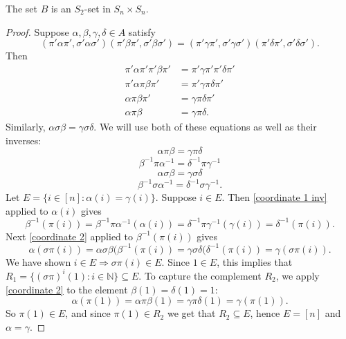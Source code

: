 \documentclass[10pt,a4paper]{amsart}
\begin{document}
\begin{claim} \label{pi alpha pi s2 set}
    The set $B$ is an $S_2$-set in $S_n\times S_n$.
\end{claim}

\begin{proof}
    Suppose $\alpha,\beta,\gamma,\delta\in A$ satisfy
    $$(\pi'\alpha\pi',\sigma'\alpha\sigma')(\pi'\beta\pi',\sigma'\beta\sigma')=(\pi'\gamma\pi',\sigma'\gamma\sigma')(\pi'\delta\pi',\sigma'\delta\sigma').$$
Then
$$\begin{aligned}
    \pi'\alpha\pi'\pi'\beta\pi'&=\pi'\gamma\pi'\pi'\delta\pi'\\
    \pi'\alpha\pi\beta\pi'&=\pi'\gamma\pi\delta\pi'\\
    \alpha\pi\beta\pi'&=\gamma\pi\delta\pi'\\
    \alpha\pi\beta&=\gamma\pi\delta.
\end{aligned}$$
Similarly, $\alpha\sigma\beta=\gamma\sigma\delta$. We will use both of these equations as well as their inverses:
\begin{equation} \label{coordinate 1}
    \alpha\pi\beta=\gamma\pi\delta
\end{equation}
\begin{equation} \label{coordinate 1 inv}
    \beta^{-1}\pi\alpha^{-1}=\delta^{-1}\pi\gamma^{-1}
\end{equation}
\begin{equation} \label{coordinate 2}
    \alpha\sigma\beta=\gamma\sigma\delta
\end{equation}
\begin{equation} \label{coordinate 2 inv}
    \beta^{-1}\sigma\alpha^{-1}=\delta^{-1}\sigma\gamma^{-1}.
\end{equation}
Let $E=\{i\in[n]:\alpha(i)=\gamma(i)\}$. Suppose $i\in E$. Then \autoref{coordinate 1 inv} applied to $\alpha(i)$ gives 
$$\beta^{-1}(\pi(i))=\beta^{-1}\pi\alpha^{-1}(\alpha(i))=\delta^{-1}\pi\gamma^{-1}(\gamma(i))=\delta^{-1}(\pi(i)).$$
Next \autoref{coordinate 2} applied to $\beta^{-1}(\pi(i))$ gives
$$\alpha(\sigma\pi(i))=\alpha\sigma\beta(\beta^{-1}(\pi(i))=\gamma\sigma\delta(\delta^{-1}(\pi(i))=\gamma(\sigma\pi(i)).$$
We have shown $i\in E\Longrightarrow\sigma\pi(i)\in E$. Since $1\in E$, this implies that $R_1=\{(\sigma\pi)^i(1):i\in\mathbb N\}\subseteq E$. To capture the complement $R_2$, we apply \autoref{coordinate 2} to the element $\beta(1)=\delta(1)=1$:
$$\alpha(\pi(1))=\alpha\pi\beta(1)=\gamma\pi\delta(1)=\gamma(\pi(1)).$$
So $\pi(1)\in E$, and since $\pi(1)\in R_2$ we get that $R_2\subseteq E$, hence $E=[n]$ and $\alpha=\gamma$. 
\end{proof}
\end{document}
